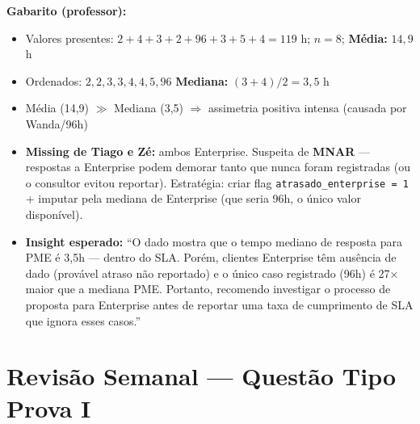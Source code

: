 \begin{SolvedBox}
\textbf{Gabarito (professor):}
\begin{itemize}
  \item Valores presentes: $2+4+3+2+96+3+5+4 = 119$ h; $n=8$; \textbf{Média:} $14{,}9$ h
  \item Ordenados: $2,2,3,3,4,4,5,96$ \quad \textbf{Mediana:} $(3+4)/2 = 3{,}5$ h
  \item Média (14,9) $\gg$ Mediana (3,5) $\Rightarrow$ assimetria positiva intensa (causada por Wanda/96h)
  \item \textbf{Missing de Tiago e Zé:} ambos Enterprise. Suspeita de \textbf{MNAR} — respostas
  a Enterprise podem demorar tanto que nunca foram registradas (ou o consultor evitou reportar).
  Estratégia: criar flag \texttt{atrasado\_enterprise = 1} + imputar pela mediana de Enterprise
  (que seria 96h, o único valor disponível).
  \item \textbf{Insight esperado:} ``O dado mostra que o tempo mediano de resposta para
  PME é 3,5h — dentro do SLA. Porém, clientes Enterprise têm ausência de dado (provável
  atraso não reportado) e o único caso registrado (96h) é 27× maior que a mediana PME.
  Portanto, recomendo investigar o processo de proposta para Enterprise antes de reportar
  uma taxa de cumprimento de SLA que ignora esses casos.''
\end{itemize}
\end{SolvedBox}

\section{Revisão Semanal — Questão Tipo Prova I}


